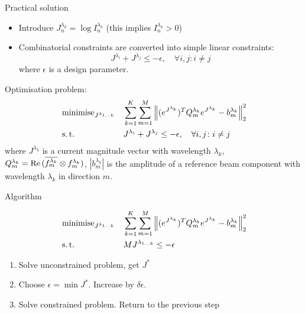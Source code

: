 \documentclass[../main.tex]{subfiles}
\begin{document}
\begin{frame}[t]{Practical solution}

\begin{itemize}
\item Introduce $J^{\lambda_k}_n = \log{I^{\lambda_k}_n}$ (this implies $I^{\lambda_k}_n > 0$)
\item Combinatorial constraints are converted into simple linear constraints:
    \begin{equation*}
  J^{\lambda_i} + J^{\lambda_j} \le -\epsilon, \quad \forall i, j \colon i \ne j
    \end{equation*}
    where $\epsilon$ is a design parameter. 
\end{itemize}

Optimisation problem:
\begin{equation*}
\begin{aligned}
& \operatorname{minimise}_{J^{\lambda_{1\ldots k}}} 
& & \sum_{k=1}^K \sum_{m=1}^M \Big\| (e^{J^{\lambda_{k}}})^T Q^{\lambda_{k}}_m  e^{J^{\lambda_{k}}} - b^{\lambda_{k}}_m \Big\|_2^2 \\
& \operatorname{s.t.}
& & J^{\lambda_i} + J^{\lambda_j} \le -\epsilon, \quad \forall i, j \colon i \ne j \\
\end{aligned}
\label{general_problem_formulation3}
\end{equation*}
where $J^{\lambda_{k}}$ is a current magnitude vector with wavelength $\lambda_{k}$, $Q^{\lambda_{k}}_m = \operatorname{Re}{(\overline{f_m^{\lambda_{k}}} \otimes f_m^{\lambda_{k}})}$, $|b^{\lambda_{k}}_m|$ is the amplitude of a reference beam component with wavelength $\lambda_{k}$ in direction $m$.

\end{frame}



\begin{frame}[t]{Algorithm}

\begin{equation*}
\begin{aligned}
& \operatorname{minimise}_{J^{\lambda_{1\ldots k}}} 
& & \sum_{k=1}^K \sum_{m=1}^M \Big\| (e^{J^{\lambda_{k}}})^T Q^{\lambda_{k}}_m  e^{J^{\lambda_{k}}} - b^{\lambda_{k}}_m \Big\|_2^2 \\
& \operatorname{s.t.}
& & M J^{\lambda_{1 \ldots k}} \le - \epsilon
\end{aligned}
\label{general_problem_formulation3}
\end{equation*}

\begin{enumerate}
    \item Solve unconstrained problem, get $J^*$
    \item Choose $\epsilon = \min{J^*}$. Increase by $\delta \epsilon$.
    \item Solve constrained problem. Return to the previous step
\end{enumerate}

\end{frame}
\end{document}
